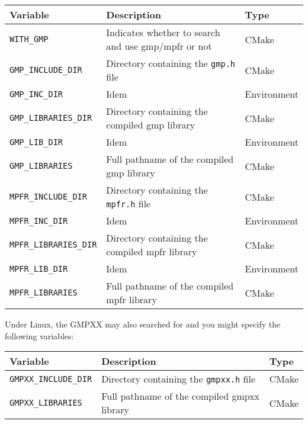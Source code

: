 \renewcommand{\arraystretch}{1.3}
\gdef\lcTabularBorder{2}
\begin{tabular}{|l|l|l|} \hline
  \textbf{Variable}             & \textbf{Description}                                & \textbf{Type}\\\hline\hline
  \texttt{WITH\_GMP}            & Indicates whether to search and use gmp/mpfr or not & CMake\\\hline
  \texttt{GMP\_INCLUDE\_DIR}    & Directory containing the \texttt{gmp.h} file        & CMake\\\hline
  \texttt{GMP\_INC\_DIR}        & Idem                                                & Environment\\\hline
  \texttt{GMP\_LIBRARIES\_DIR}  & Directory containing the compiled gmp library       & CMake\\\hline
  \texttt{GMP\_LIB\_DIR}        & Idem                                                & Environment\\\hline
  \texttt{GMP\_LIBRARIES}       & Full pathname of the compiled gmp library           & CMake\\\hline
  \texttt{MPFR\_INCLUDE\_DIR}   & Directory containing the \texttt{mpfr.h} file       & CMake\\\hline
  \texttt{MPFR\_INC\_DIR}       & Idem                                                & Environment\\\hline
  \texttt{MPFR\_LIBRARIES\_DIR} & Directory containing the compiled mpfr library      & CMake\\\hline
  \texttt{MPFR\_LIB\_DIR}       & Idem                                                & Environment\\\hline
  \texttt{MPFR\_LIBRARIES}      & Full pathname of the compiled mpfr library          & CMake\\\hline
\end{tabular}

Under Linux, the GMPXX may also searched for and you might specify the following variables:

\renewcommand{\arraystretch}{1.3}
\gdef\lcTabularBorder{2}
\begin{tabular}{|l|l|l|} \hline
  \textbf{Variable}             & \textbf{Description}                           & \textbf{Type}\\\hline\hline
  \texttt{GMPXX\_INCLUDE\_DIR}  & Directory containing the \texttt{gmpxx.h} file & CMake\\\hline
  \texttt{GMPXX\_LIBRARIES}     & Full pathname of the compiled gmpxx library    & CMake\\\hline
\end{tabular}

